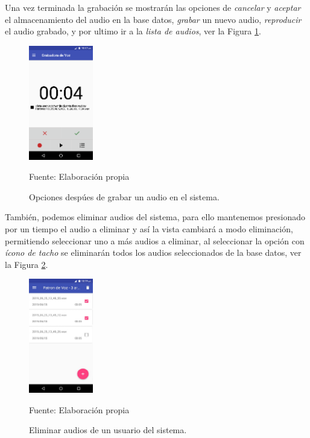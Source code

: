 Una vez terminada la grabación se mostrarán las opciones de \textit{cancelar} y \textit{aceptar} el almacenamiento del audio en la base datos, \textit{grabar} un nuevo audio, \textit{reproducir} el audio grabado, y por ultimo ir a la \textit{lista de audios}, ver la Figura \ref{fig:figura3.45}.
\begin{figure}[H]
\captionsetup{justification=centering}
\begin{center}
\includegraphics[width=0.25\textwidth]{Imagenes/Cap3/image045}
\end{center}
\begin{center}
\vskip -0.5cm
\caption{\small{Opciones despúes de grabar un audio en el sistema.}}
\label{fig:figura3.45}
{\small{Fuente: Elaboración propia}}
\end{center}
\end{figure}

También, podemos eliminar audios del sistema, para ello mantenemos presionado por un tiempo el audio a eliminar y así la vista cambiará a modo eliminación, permitiendo seleccionar uno a más audios a eliminar, al seleccionar la opción con \textit{ícono de tacho} se eliminarán todos los audios seleccionados de la base datos, ver la Figura \ref{fig:figura3.46}.
\begin{figure}[H]
\captionsetup{justification=centering}
\begin{center}
\includegraphics[width=0.25\textwidth]{Imagenes/Cap3/image046}
\end{center}
\begin{center}
\vskip -0.5cm
\caption{\small{Eliminar audios de un usuario del sistema.}}
\label{fig:figura3.46}
{\small{Fuente: Elaboración propia}}
\end{center}
\end{figure}

